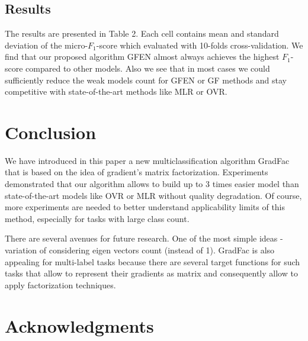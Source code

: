 \documentclass{article}
\begin{document}
\subsection{Results}

The results are presented in Table 2. Each cell contains mean and standard deviation of the micro-$F_1$-score which evaluated with 10-folds cross-validation. We find that our proposed algorithm GFEN almost always achieves the highest $F_1$-score compared to other models. Also we see that in most cases we could sufficiently reduce the weak models count for GFEN or GF methods and stay competitive with state-of-the-art methods like MLR or OVR.


\section{Conclusion}
We have introduced in this paper a new multiclassification algorithm GradFac that is based on the idea of gradient's matrix factorization. Experiments demonstrated that our algorithm allows to build up to 3 times easier model than state-of-the-art models like OVR or MLR without quality degradation. Of course, more experiments are needed to better understand applicability limits of this method, especially for tasks with large class count.

There are several avenues for future research. One of the most simple ideas - variation of considering eigen vectors count (instead of 1). GradFac is also appealing for multi-label tasks because there are several target functions for such tasks \cite{Tsoumakas07multi-labelclassification} that allow to represent their gradients as matrix and consequently allow to apply factorization techniques.

\clearpage
\section*{Acknowledgments} 



\nocite{Hastie_theelements}
\nocite{GLM}
\nocite{Friedman98additivelogistic}
\nocite{Friedman00greedyfunction}
\nocite{Zhao_sparseoutput}
\nocite{Allwein00reducingmulticlass}
\nocite{Crammer00onthe}
\nocite{Rifkin04indefense}
\nocite{Lee01algorithmsfor}
\nocite{Koren09matrixfactorization}
\nocite{Hu08collaborativefiltering}
\nocite{Gulin_winningthe}
\nocite{Eckart1936}
\nocite{elasticnet05}
\nocite{Efron1992bootstrap}
\nocite{uciRepo}



\end{document}
